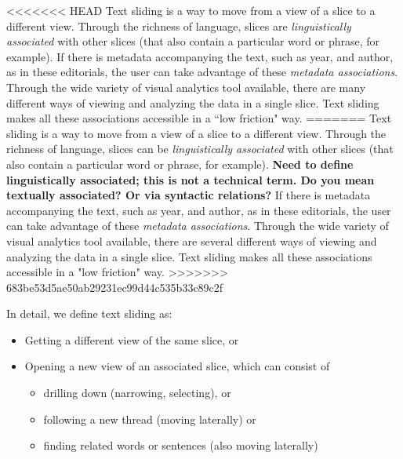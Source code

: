 \documentclass{sig-alternate}
\newcommand{\strong}[1] {\textbf{#1}}
\begin{document}
<<<<<<< HEAD
Text sliding is a way to move from a view of a slice to a different view. Through the richness of language, slices are \emph{linguistically associated} with other slices (that also contain a particular word or phrase, for example). If there is metadata accompanying the text, such as year, and author, as in these editorials, the user can take advantage of these  \emph{metadata associations}.  Through the wide variety of visual analytics tool available, there are many different ways of viewing and analyzing the data in a single slice. Text sliding makes all these associations accessible in a ``low friction" way.
=======
Text sliding is a way to move from a view of a slice to a different view. Through the richness of language, slices can be \emph{linguistically associated} with other slices (that also contain a particular word or phrase, for example). \strong{Need to define linguistically associated; this is not a technical term.  Do you mean textually associated?  Or via syntactic relations?} If there is metadata accompanying the text, such as year, and author, as in these editorials, the user can take advantage of these  \emph{metadata associations}.  Through the wide variety of visual analytics tool available, there are several different ways of viewing and analyzing the data in a single slice. Text sliding makes all these associations accessible in a "low friction" way.
>>>>>>> 683be53d5ae50ab29231ec99d44c535b33c89c2f

In detail, we define text sliding as:
\begin{itemize}
	\item Getting a different view of the same slice, or
	\item Opening a new view of an associated slice, which can consist of
	\begin{itemize}
	  \item drilling down (narrowing, selecting), or
	  \item following a new thread (moving laterally) or
	  \item finding related words or sentences  (also moving laterally)
	 \end{itemize}
\end{itemize}
\end{document}
